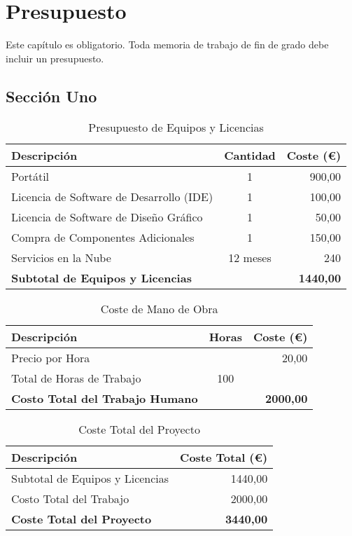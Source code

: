 \chapter{Presupuesto}
\label{ch:presupuesto}

\noindent Este capítulo es obligatorio. Toda memoria de trabajo de fin de grado debe incluir un presupuesto.

\section{Sección Uno}

\begin{table}[!ht]
\centering
\caption{Presupuesto de Equipos y Licencias}
\begin{tabularx}{0.8\textwidth}{Xcr}
    \toprule
    \textbf{Descripción} & \textbf{Cantidad} & \textbf{Coste (€)} \\
    \midrule
    Portátil & 1 & 900,00 \\
    Licencia de Software de Desarrollo (IDE) & 1 & 100,00 \\
    Licencia de Software de Diseño Gráfico & 1 & 50,00 \\
    Compra de Componentes Adicionales & 1 & 150,00 \\
    Servicios en la Nube & 12 meses & 240 \\
    \midrule
    \textbf{Subtotal de Equipos y Licencias} & & \textbf{1440,00} \\
    \bottomrule
\end{tabularx}
\end{table}

\begin{table}[!ht]
\centering
\caption{Coste de Mano de Obra}
\begin{tabularx}{0.8\textwidth}{Xcr}
    \toprule
    \textbf{Descripción} & \textbf{Horas} & \textbf{Coste (€)} \\
    \midrule
    Precio por Hora & & 20,00 \\
    Total de Horas de Trabajo & 100 & \\
    \midrule
    \textbf{Costo Total del Trabajo Humano} & & \textbf{2000,00} \\
    \bottomrule
\end{tabularx}
\end{table}

\begin{table}[!ht]
\centering
\caption{Coste Total del Proyecto}
\label{tbl:presupuesto}
\begin{tabularx}{0,8\textwidth}{Xr}
    \toprule
    \textbf{Descripción} & \textbf{Coste Total (€)} \\
    \midrule
    Subtotal de Equipos y Licencias & 1440,00 \\
    Costo Total del Trabajo & 2000,00 \\
    \midrule
    \textbf{Coste Total del Proyecto} & \textbf{3440,00} \\
    \bottomrule
\end{tabularx}
\end{table}
